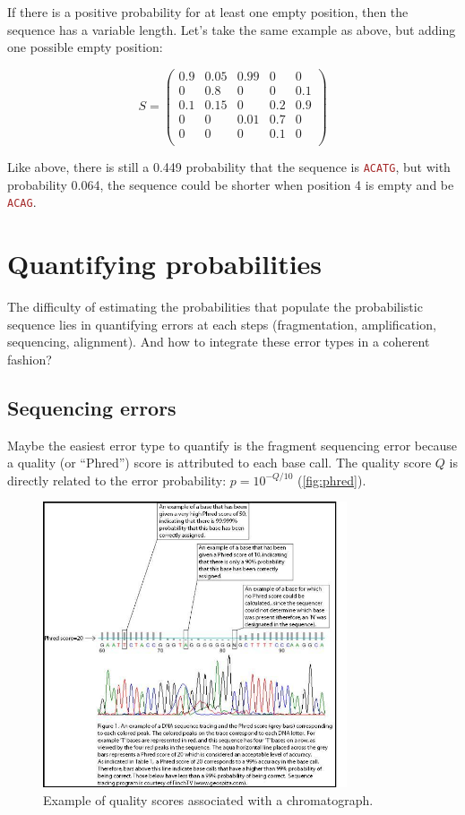 \documentclass[12pt]{article}
\newcommand{\sq}[1]{\texttt{\textcolor{brown}{#1}}}
\begin{document}
If there is a positive probability for at least one empty position, then the sequence has a variable length. 
Let's take the same example as above, but adding one possible empty position:

$$
S = 
\begin{pmatrix}
0.9 & 0.05   & 0.99 & 0 & 0\\
0   & 0.8 & 0 & 0 & 0.1\\
0.1 & 0.15 & 0 & 0.2 & 0.9\\
0 & 0 & 0.01 & 0.7 & 0\\
0 & 0 & 0 & 0.1 & 0\\
\end{pmatrix}
$$

Like above, there is still a 0.449 probability that the sequence is \sq{ACATG}, but with probability 0.064, the sequence could be shorter when position 4 is empty and be \sq{ACAG}.



\section{Quantifying probabilities}

The difficulty of estimating the probabilities that populate the probabilistic sequence lies in quantifying errors at each steps (fragmentation, amplification, sequencing, alignment). And how to integrate these error types in a coherent fashion?


\subsection{Sequencing errors}

Maybe the easiest error type to quantify is the fragment sequencing error because a quality (or ``Phred'') score is attributed to each base call. The quality score $Q$ is directly related to the error probability: $p = 10^{-Q/10}$ (\autoref{fig:phred}). 

\begin{figure}[H]
\begin{center}
 \includegraphics[width = 0.8\textwidth]{figs/Phred.jpg}
\caption{Example of quality scores associated with a chromatograph.}
\label{fig:phred}
\end{center}
\end{figure}
\end{document}
